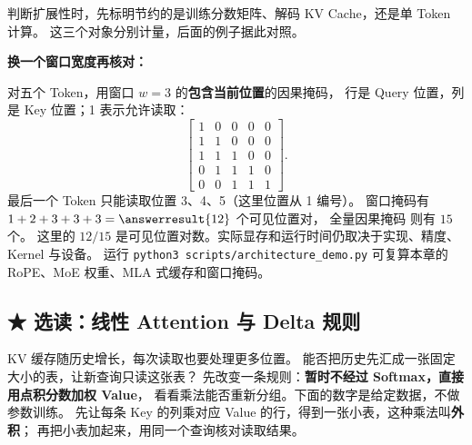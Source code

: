 判断扩展性时，先标明节约的是训练分数矩阵、解码 KV Cache，还是单 Token 计算。
这三个对象分别计量，后面的例子据此对照。

\noindent\textbf{换一个窗口宽度再核对：}\par
对五个 Token，用窗口 $w=3$ 的\textbf{包含当前位置}的因果掩码，
行是 Query 位置，列是 Key 位置；1 表示允许读取：
\[
\boxed{\begin{bmatrix}
1&0&0&0&0\\
1&1&0&0&0\\
1&1&1&0&0\\
0&1&1&1&0\\
0&0&1&1&1
\end{bmatrix}}.
\]
最后一个 Token 只能读取位置 3、4、5（这里位置从 1 编号）。
窗口掩码有 $1+2+3+3+3=\answerresult{12}$ 个可见位置对，
全量因果掩码 则有 $15$ 个。
这里的 $12/15$ 是可见位置对数。实际显存和运行时间仍取决于实现、精度、Kernel 与设备。
运行 \texttt{python3 scripts/architecture\_demo.py} 可复算本章的 RoPE、MoE 权重、MLA 式缓存和窗口掩码。

\subsection{\texorpdfstring{{\symboliconfont ★}}{★} 选读：线性 Attention 与 Delta 规则}
\label{sec:modern-linear-state}
\label{concept:linear-attention}

KV 缓存随历史增长，每次读取也要处理更多位置。
能否把历史先汇成一张固定大小的表，让新查询只读这张表？
先改变一条规则：\textbf{暂时不经过 Softmax，直接用点积分数加权 Value}，
看看乘法能否重新分组。下面的数字是给定数据，不做参数训练。
先让每条 Key 的列乘对应 Value 的行，得到一张小表，这种乘法叫\textbf{外积}；
再把小表加起来，用同一个查询核对读取结果。

